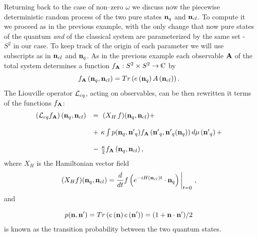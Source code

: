 \documentclass[12pt]{article}
\def\complex{{\kern .1em {\raise .47ex \hbox
{$\scriptscriptstyle
|$}}
\kern -.4em {\rm C}}}
\def\be{\begin{equation}} \def\ee{\end{equation}}
\begin{document}
Returning back to the case of non--zero $\omega$ we discuss now
the piecewise deterministic random process
of the two pure states ${\bf n}_q$ and
${\bf n}_{cl}$.  To compute it we proceed as in the previous example, 
with the
only change that now pure states of the quantum {\em and} of the classical
system are parameterized by the same set - $S^2$ in our case.  To keep track of
the origin of each parameter we will use subscripts as in ${\bf n}_{cl}$ and
${\bf n}_{q}$.  As in the previous example each observable ${\bf A}$ of the
total
system determines a function $f_{\bf A}: S^2\times S^2\rightarrow\complex$ by
$$f_{\bf A}\left ({\bf n}_q, {\bf n}_{cl}\right)=Tr\left (e\left ({\bf
n}_q\right)A\left ({\bf n}_{cl}\right)\right). $$ 
The Liouville operator  ${\cal L}_{cq}$,  acting on observables,   can be then  
rewritten it terms of the functions  $f_{\bf A}$: 
 \be
 \begin{array}{ll}
\left ({\cal L}_{cq}f_{\bf A}\right)\left ({\bf n}_q, {\bf n}_{cl}\right)
& 
= \   (X_H\,  f) ({\bf n}_q, {\bf n}_{cl})  +
\cr\cr
& + \  \kappa\int p ({\bf n}_q, {\bf n'}_{q}) f_{\bf A}\left ({\bf n'}_{q}, 
{{\bf n'}_{q}} ({\bf n}_{q})\right)d\mu \left ({\bf n'}_{q}\right) +
\cr\cr
& - \ {\kappa\over 2} f_{\bf A}\left ({\bf n}_q, {\bf n}_{cl}\right), 
\end{array}
\ee
where $X_H$ is the Hamiltonian vector field
\be
 (X_H f) ({\bf n}_q, {\bf n}_{cl})={d\over dt}f\left (e^{-iH ({\bf n}_{cl})t}
\cdot {\bf n}_{q}
\right)\bigg\vert_{t=0} \  , 
\ee
and

\be
 p ({\bf n}, {\bf n'}) = Tr\left (e\left ({\bf n}\right)e\left ({\bf
n'}\right)\right)= (1+{\bf n\cdot n'})/2
\ee
is known as the transition probability between the two quantum states.
\end{document}
